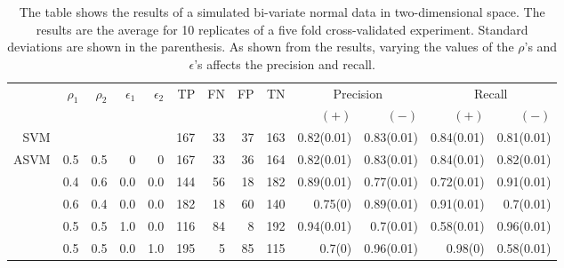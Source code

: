 \documentclass[twoside,11pt]{article}
\begin{document}
\begin{table}[htp]\label{simulatedsvmtable}

    \small\begin{tabular}{rrrrr|rrrrrrrr}
    \hline
    &\multirow{2}{*}{$\rho_1$} & \multirow{2}{*}{$\rho_2$} & \multirow{2}{*}{$\epsilon_1$} & \multirow{2}{*}{$\epsilon_2$} & \multirow{2}{*}{TP}    & \multirow{2}{*}{FN}    & \multirow{2}{*}{FP}    & \multirow{2}{*}{TN} & \multicolumn{2}{c}{Precision} & \multicolumn{2}{c}{Recall}\\
    &&&&&&&&&  $(+)$ &  $(-)$ &  $(+)$ &  $(-)$ \bigstrut\\

\hline
\hline
SVM &       &       &       &       & 167   & 33    & 37    & 163   & 0.82(0.01) & 0.83(0.01) & 0.84(0.01) & 0.81(0.01) \bigstrut\\
\hline
\multirow{2}{*}{ASVM} & 0.5   & 0.5   & 0     & 0     & 167   & 33    & 36    & 164   & 0.82(0.01) & 0.83(0.01) & 0.84(0.01) & 0.82(0.01) \bigstrut[t]\\
      & 0.4   & 0.6   & 0.0   & 0.0   & 144   & 56    & 18    & 182   & 0.89(0.01) & 0.77(0.01) & 0.72(0.01) & 0.91(0.01) \\
      & 0.6   & 0.4   & 0.0   & 0.0   & 182   & 18    & 60    & 140   & 0.75(0) & 0.89(0.01) & 0.91(0.01) & 0.7(0.01) \\
      & 0.5   & 0.5   & 1.0   & 0.0   & 116   & 84    & 8     & 192   & 0.94(0.01) & 0.7(0.01) & 0.58(0.01) & 0.96(0.01) \\
      & 0.5   & 0.5   & 0.0   & 1.0   & 195   & 5     & 85    & 115   & 0.7(0) & 0.96(0.01) & 0.98(0) & 0.58(0.01) \bigstrut[b]\\
\hline
\hline
\end{tabular}
\caption{The table shows the results of a simulated bi-variate normal data in two-dimensional space. The results are the average for 10 replicates of a five fold cross-validated experiment. Standard deviations are shown in the parenthesis. As shown from the results, varying the values of the $\rho$'s and $\epsilon$'s affects the precision and recall.}
\end{table}
\end{document}
